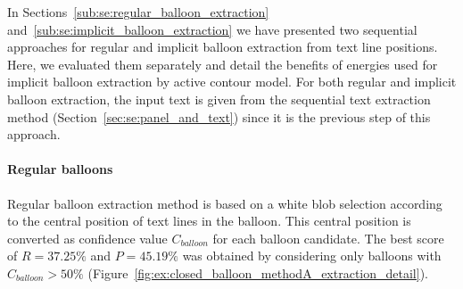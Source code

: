 In Sections~\ref{sub:se:regular_balloon_extraction} and~\ref{sub:se:implicit_balloon_extraction} we have presented two sequential approaches for regular and implicit balloon extraction from text line positions.
Here, we evaluated them separately and detail the benefits of energies used for implicit balloon extraction by active contour model.
For both regular and implicit balloon extraction, the input text is given from the sequential text extraction method (Section~\ref{sec:se:panel_and_text}) since it is the previous step of this approach.

\paragraph{Regular balloons} %
\label{par:regular_balloons}

Regular balloon extraction method is based on a white blob selection according to the central position of text lines in the balloon.
This central position is converted as confidence value $C_{balloon}$ for each balloon candidate.
The best score of $R=37.25\%$ and $P=45.19\%$ was obtained by considering only balloons with $C_{balloon} > 50\%$ (Figure~\ref{fig:ex:closed_balloon_methodA_extraction_detail}).






